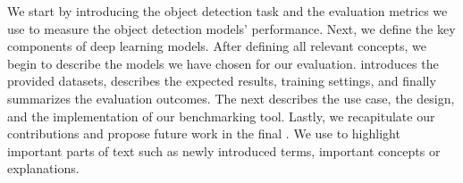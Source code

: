 We start by introducing the object detection task and the evaluation metrics we
use to measure the object detection models' performance. Next, we define the key
components of deep learning models. After defining all relevant concepts, we
begin to describe the models we have chosen for our evaluation.
 introduces the provided datasets, describes the expected
results, training settings, and finally summarizes the evaluation outcomes. The
next  describes the use case, the design, and the
implementation of our benchmarking tool. Lastly, we recapitulate our
contributions and propose future work in the final
. We use  to highlight important
parts of text such as newly introduced terms, important concepts or explanations.

